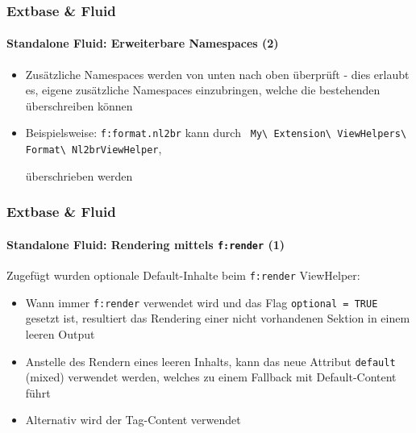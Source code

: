 \begin{frame}[fragile]
	\frametitle{Extbase \& Fluid}
	\framesubtitle{Standalone Fluid: Erweiterbare Namespaces (2)}

	\begin{itemize}

		\item Zusätzliche Namespaces werden von unten nach oben überprüft - dies erlaubt es, eigene zusätzliche Namespaces einzubringen, welche die bestehenden überschreiben können

		\item Beispielsweise: \texttt{f:format.nl2br} kann durch
			\texttt{
				My\textbackslash
				Extension\textbackslash
				ViewHelpers\textbackslash
				Format\textbackslash
				Nl2brViewHelper},

				überschrieben werden

	\end{itemize}

\end{frame}


\begin{frame}[fragile]
	\frametitle{Extbase \& Fluid}
	\framesubtitle{Standalone Fluid: Rendering mittels \texttt{f:render} (1)}

	Zugefügt wurden optionale Default-Inhalte beim \texttt{f:render} ViewHelper:

	\begin{itemize}

		\item Wann immer \texttt{f:render} verwendet wird und das Flag \texttt{optional = TRUE}
			gesetzt ist, resultiert das Rendering einer nicht vorhandenen Sektion in einem leeren Output

		\item Anstelle des Rendern eines leeren Inhalts, kann das neue Attribut \texttt{default}
			(mixed) verwendet werden, welches zu einem Fallback mit Default-Content führt

		\item Alternativ wird der Tag-Content verwendet

	\end{itemize}

\end{frame}

